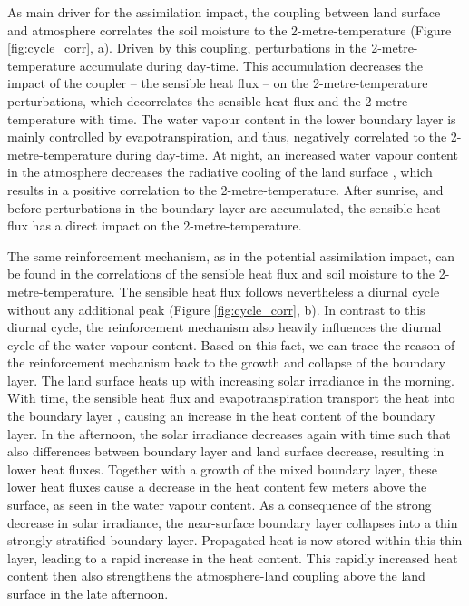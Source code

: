 \documentclass[HESSD, manuscript]{copernicus}
\begin{document}
As main driver for the assimilation impact, the coupling between land surface and atmosphere correlates the soil moisture to the 2-metre-temperature (Figure \ref{fig:cycle_corr}, a).
Driven by this coupling, perturbations in the 2-metre-temperature accumulate during day-time.
This accumulation decreases the impact of the coupler – the sensible heat flux – on the 2-metre-temperature perturbations, which decorrelates the sensible heat flux and the 2-metre-temperature with time.
The water vapour content in the lower boundary layer is mainly controlled by evapotranspiration, and thus, negatively correlated to the 2-metre-temperature during day-time.
At night, an increased water vapour content in the atmosphere decreases the radiative cooling of the land surface \citep{harrison_effect_1981}, which results in a positive correlation to the 2-metre-temperature.
After sunrise, and before perturbations in the boundary layer are accumulated, the sensible heat flux has a direct impact on the 2-metre-temperature.

The same reinforcement mechanism, as in the potential assimilation impact,
can be found in the correlations of the sensible heat flux and soil moisture to the 2-metre-temperature.
The sensible heat flux follows nevertheless a diurnal cycle without any additional peak (Figure \ref{fig:cycle_corr}, b).
In contrast to this diurnal cycle, the reinforcement mechanism also heavily influences the diurnal cycle of the water vapour content.
Based on this fact, we can trace the reason of the reinforcement mechanism back to the growth and collapse of the boundary layer.
The land surface heats up with increasing solar irradiance in the morning.
With time, the sensible heat flux and evapotranspiration transport the heat into the boundary layer \citep{stull_introduction_1988}, causing an increase in the heat content of the boundary layer.
In the afternoon, the solar irradiance decreases again with time such that also differences between boundary layer and land surface decrease, resulting in lower heat fluxes.
Together with a growth of the mixed boundary layer, these lower heat fluxes cause a decrease in the heat content few meters above the surface, as seen in the water vapour content.
As a consequence of the strong decrease in solar irradiance, the near-surface boundary layer collapses into a thin strongly-stratified boundary layer.
Propagated heat is now stored within this thin layer, leading to a rapid increase in the heat content.
This rapidly increased heat content then also strengthens the atmosphere-land coupling above the land surface in the late afternoon.\\
\end{document}
